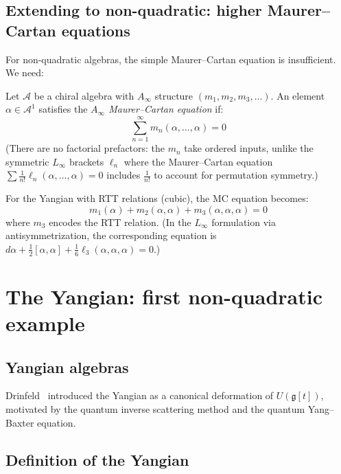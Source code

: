 \subsection{Extending to non-quadratic: higher Maurer--Cartan equations}

For non-quadratic algebras, the simple Maurer--Cartan equation is insufficient. We need:

\begin{definition}
Let $\mathcal{A}$ be a chiral algebra with
$A_\infty$ structure $(m_1, m_2, m_3, \ldots)$.
An element $\alpha \in \mathcal{A}^1$ satisfies the
\emph{$A_\infty$ Maurer--Cartan equation} if:
\[
\sum_{n=1}^{\infty} m_n(\alpha, \ldots, \alpha) = 0
\]
(There are no factorial prefactors: the $m_n$ take ordered inputs, unlike the
symmetric $L_\infty$ brackets $\ell_n$ where the Maurer--Cartan equation
$\sum \frac{1}{n!}\ell_n(\alpha,\ldots,\alpha) = 0$ includes $\frac{1}{n!}$
to account for permutation symmetry.)
\end{definition}

\begin{example}
For the Yangian with RTT relations (cubic), the MC equation becomes:
\[
m_1(\alpha) + m_2(\alpha, \alpha) + m_3(\alpha, \alpha, \alpha) = 0
\]
where $m_3$ encodes the RTT relation.  (In the $L_\infty$ formulation via
antisymmetrization, the corresponding equation is
$d\alpha + \frac{1}{2}[\alpha,\alpha] + \frac{1}{6}\ell_3(\alpha,\alpha,\alpha) = 0$.)
\end{example}


\section{The Yangian: first non-quadratic example}

\subsection{Yangian algebras}

Drinfeld~\cite{Drinfeld85} introduced the Yangian as a canonical deformation of $U(\mathfrak{g}[t])$, motivated by the quantum inverse scattering method and the quantum Yang--Baxter equation.

\subsection{Definition of the Yangian}

